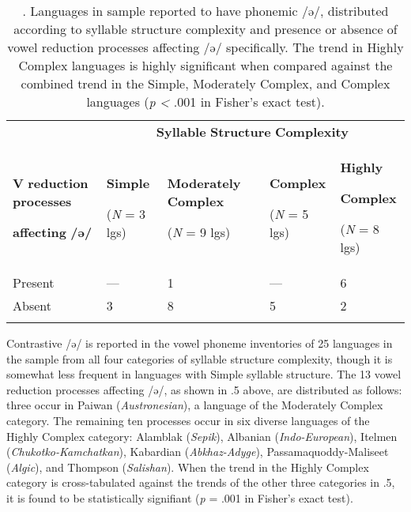 \begin{table}
\begin{tabularx}{\textwidth}{XXXXX}
\lsptoprule
 & \multicolumn{4}{c}{ \textbf{Syllable} \textbf{Structure} \textbf{Complexity}}\\
{ \textbf{V} \textbf{reduction} \textbf{processes} }

 \textbf{affecting} \textbf{/ə/} & { \textbf{Simple}}

 (\textit{N} = 3 lgs) & { \textbf{Moderately} \textbf{Complex}}

 (\textit{N} = 9 lgs) & { \textbf{Complex}}

 (\textit{N} = 5 lgs) & { \textbf{Highly} }

{ \textbf{Complex}}

 (\textit{N} = 8 lgs)\\
 Present & — & 1 & — & 6\\
 Absent & 3 & 8 & 5 & 2\\
\lspbottomrule
\end{tabularx}
\caption{\label{tab:key:6.5}. Languages in sample reported to have phonemic /ə/, distributed according to syllable structure complexity and presence or absence of vowel reduction processes affecting /ə/ specifically. The trend in Highly Complex languages is highly significant when compared against the combined trend in the Simple, Moderately Complex, and Complex languages (\textit{p} \textit{<} .001 in Fisher’s exact test).}
\end{table}




  Contrastive /ə/ is reported in the vowel phoneme inventories of 25 languages in the sample from all four categories of syllable structure complexity, though it is somewhat less frequent in languages with Simple syllable structure. The 13 vowel reduction processes affecting /ə/, as shown in .5 above, are distributed as follows: three occur in Paiwan (\textit{Austronesian}), a language of the Moderately Complex category. The remaining ten processes occur in six diverse languages of the Highly Complex category: Alamblak (\textit{Sepik}), Albanian (\textit{Indo-European}), Itelmen (\textit{Chukotko-Kamchatkan}), Kabardian (\textit{Abkhaz-Adyge}), Passamaquoddy-Maliseet (\textit{Algic}), and Thompson (\textit{Salishan}). When the trend in the Highly Complex category is cross-tabulated against the trends of the other three categories in .5, it is found to be statistically signifiant (\textit{p} = .001 in Fisher’s exact test).



